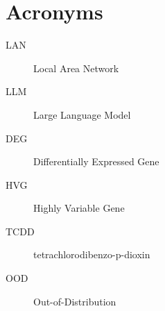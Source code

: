 \section{Acronyms}

\begin{description}
  \item[LAN] Local Area Network
  \item[LLM] Large Language Model
  \item[DEG] Differentially Expressed Gene
  \item[HVG] Highly Variable Gene
  \item[TCDD] tetrachlorodibenzo-p-dioxin 
  \item[OOD] Out-of-Distribution 
\end{description}
